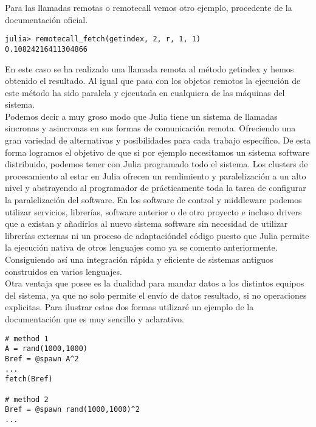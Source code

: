 \documentclass[10pt,a4paper]{article}
\begin{document}
Para las llamadas remotas o remotecall vemos otro ejemplo, procedente de la documentación oficial.
\begin{verbatim}
julia> remotecall_fetch(getindex, 2, r, 1, 1)
0.10824216411304866
\end{verbatim}

En este caso se ha realizado una llamada remota al método getindex y hemos obtenido el resultado. Al igual que pasa con los objetos remotos la ejecución de este método ha sido paralela y ejecutada en cualquiera de las máquinas del sistema.\\

Podemos decir a muy groso modo que Julia tiene un sistema de llamadas sincronas y asincronas en sus formas de comunicación remota. Ofreciendo una gran variedad de alternativas y posibilidades para cada trabajo específico. De esta forma logramos el objetivo de que si por ejemplo necesitamos un sistema software distribuido, podemos tener con Julia programado todo el sistema. Los clusters de procesamiento al estar en Julia ofrecen un rendimiento y paralelización a un alto nivel y abstrayendo al programador de prácticamente toda la tarea de configurar la paralelización del software. En los software de control y middleware podemos utilizar servicios, librerías, software anterior o de otro proyecto e incluso drivers que a existan y añadirlos al nuevo sistema software sin necesidad de utilizar librerías externas ni un proceso de adaptacióndel código puesto que Julia permite la ejecución nativa de otros lenguajes como ya se comento anteriormente. Consiguiendo así una integración rápida y eficiente de sistemas antiguos construidos en varios lenguajes.\\

Otra ventaja que posee es la dualidad para mandar datos a los distintos equipos del sistema, ya que no solo permite el envío de datos resultado, si no operaciones explicitas. Para ilustrar estas dos formas utilizaré un ejemplo de la documentación que es muy sencillo y aclarativo.

\begin{verbatim}
# method 1
A = rand(1000,1000)
Bref = @spawn A^2
...
fetch(Bref)

# method 2
Bref = @spawn rand(1000,1000)^2
...
\end{verbatim}
\end{document}
